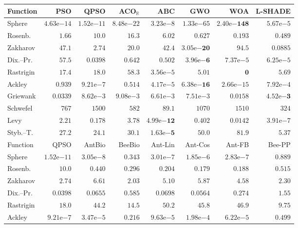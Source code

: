 \begin{tabular}{lrrrrrrr}
\toprule
Function & PSO & QPSO & ACO$_\mathbb{R}$ & ABC & GWO & WOA & L-SHADE \\
\midrule
Sphere & $4.63\mathrm{e}{-14}$ & $1.52\mathrm{e}{-11}$ & $8.48\mathrm{e}{-22}$ & $3.23\mathrm{e}{-8}$ & $1.33\mathrm{e}{-65}$ & $\mathbf{2.40\mathrm{e}{-148}}$ & $5.67\mathrm{e}{-5}$ \\
Rosenb. & $1.66$ & $10.0$ & $16.3$ & $6.02$ & $0.627$ & $0.193$ & $0.489$ \\
Zakharov & $47.1$ & $2.74$ & $20.0$ & $42.4$ & $\mathbf{3.05\mathrm{e}{-20}}$ & $94.5$ & $0.0885$ \\
Dix.--Pr. & $57.5$ & $0.0398$ & $0.642$ & $0.502$ & $\mathbf{3.96\mathrm{e}{-6}}$ & $7.37\mathrm{e}{-5}$ & $6.25\mathrm{e}{-5}$ \\
Rastrigin & $17.4$ & $18.0$ & $58.3$ & $3.56\mathrm{e}{-5}$ & $5.01$ & $\mathbf{0}$ & $5.69$ \\
Ackley & $0.939$ & $9.21\mathrm{e}{-7}$ & $0.514$ & $4.17\mathrm{e}{-5}$ & $\mathbf{6.38\mathrm{e}{-16}}$ & $2.66\mathrm{e}{-15}$ & $7.92\mathrm{e}{-4}$ \\
Griewank & $0.0339$ & $8.62\mathrm{e}{-3}$ & $9.08\mathrm{e}{-3}$ & $6.61\mathrm{e}{-3}$ & $7.51\mathrm{e}{-3}$ & $0.0158$ & $\mathbf{4.52\mathrm{e}{-3}}$ \\
Schwefel & $767$ & $1500$ & $582$ & $\mathbf{89.1}$ & $1070$ & $1510$ & $324$ \\
Levy & $2.21$ & $0.178$ & $3.78$ & $\mathbf{4.99\mathrm{e}{-12}}$ & $0.402$ & $0.0142$ & $3.91\mathrm{e}{-7}$ \\
Styb.--T. & $27.2$ & $24.1$ & $30.1$ & $\mathbf{1.63\mathrm{e}{-5}}$ & $50.0$ & $81.9$ & $5.37$ \\
\midrule
Function & QPSO & AntBio & BeeBio & Ant-Lin & Ant-Cos & Ant-FB & Bee-PP \\
\midrule
Sphere & $1.52\mathrm{e}{-11}$ & $3.05\mathrm{e}{-8}$ & $0.343$ & $3.01\mathrm{e}{-7}$ & $1.85\mathrm{e}{-6}$ & $2.83\mathrm{e}{-7}$ & $0.889$ \\
Rosenb. & $10.0$ & $0.440$ & $0.296$ & $0.204$ & $\mathbf{0.179}$ & $0.188$ & $0.515$ \\
Zakharov & $2.74$ & $6.61$ & $2.03$ & $5.10$ & $5.87$ & $4.58$ & $2.30$ \\
Dix.--Pr. & $0.0398$ & $0.0655$ & $0.585$ & $0.0698$ & $0.0564$ & $0.274$ & $1.55$ \\
Rastrigin & $18.0$ & $44.2$ & $14.5$ & $50.2$ & $45.8$ & $46.9$ & $9.75$ \\
Ackley & $9.21\mathrm{e}{-7}$ & $3.47\mathrm{e}{-5}$ & $0.216$ & $9.63\mathrm{e}{-5}$ & $1.98\mathrm{e}{-4}$ & $6.22\mathrm{e}{-5}$ & $0.499$ \\

\end{tabular}
